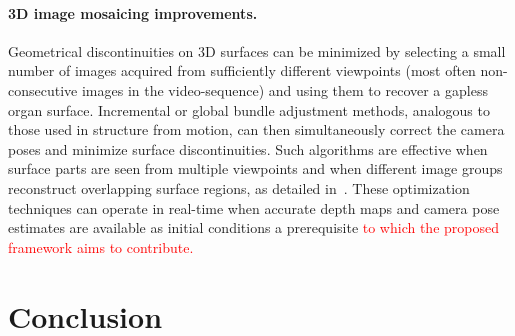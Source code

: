 \documentclass[a4paper,fleqn]{cas-dc}
\begin{document}
\paragraph{3D image mosaicing improvements.}

Geometrical discontinuities on 3D surfaces can be minimized by selecting a small number of images acquired from sufficiently different viewpoints (most often non-consecutive images in the video-sequence) and using them to recover a gapless organ surface. Incremental or global bundle adjustment methods, analogous to those used in structure from motion, can then simultaneously correct the camera poses and minimize surface discontinuities. Such algorithms are effective when surface parts are seen from multiple viewpoints and when different image groups reconstruct overlapping surface regions, as detailed in~\citep{Phan_PR_2020}. 
These optimization techniques can operate in real-time when accurate depth maps and camera pose estimates are available as initial conditions a prerequisite \textcolor{red}{to which the proposed framework aims to contribute.}
%
\section{Conclusion\label{sec:conclusions}}
\end{document}
